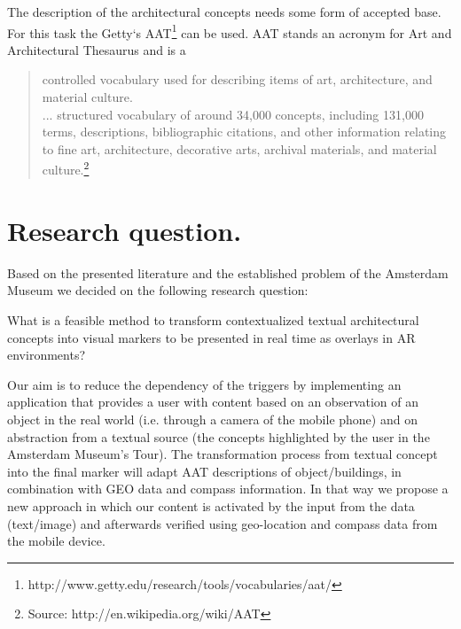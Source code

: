 \documentclass[12pt ,twocolumn]{article}
\begin{document}
The description of the architectural concepts needs some form of accepted base. For this task the Getty`s AAT\footnote{http://www.getty.edu/research/tools/vocabularies/aat/} can be used. 
AAT stands an acronym for Art and Architectural Thesaurus and is a
\begin{quotation}
controlled vocabulary used for describing items of art, architecture, and material culture. \\
... structured vocabulary of around 34,000 concepts, including 131,000 terms, descriptions, bibliographic citations, and other information relating to fine art, architecture, decorative arts, archival materials, and material 
culture.\footnote{Source: http://en.wikipedia.org/wiki/AAT}
\end{quotation}

\section{Research question.}\label{research question.}
Based on the presented literature and the established problem of the Amsterdam Museum we decided on the following research question:

What is a feasible method to transform contextualized textual architectural concepts into visual markers to be presented in real time as overlays in AR environments?

Our aim is to reduce the dependency of the triggers by implementing an application that provides a user with content based on an observation of an object in the real world (i.e. through a camera of the mobile phone) and on abstraction from a textual source (the concepts highlighted by the user in the Amsterdam Museum’s Tour). The transformation process from textual concept into the final marker will adapt AAT  descriptions of object/buildings, in combination with GEO data and compass information. In that way we  propose a new approach in which our content is activated by the input from the data (text/image) and afterwards verified using geo-location and compass data from the mobile device.  
\end{document}
